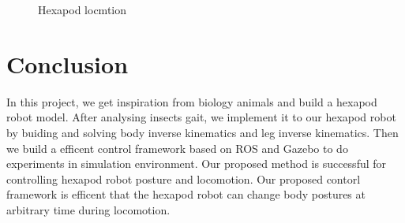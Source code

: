 \documentclass[conference]{IEEEtran}
\begin{document}
\begin{figure}
    \centering
    \caption{Hexapod locmtion}
    \label{fig1111}
\end{figure}

\section{Conclusion}

In this project, we get inspiration from biology animals and build a hexapod robot model. After analysing insects gait, we implement it to our hexapod robot by buiding and solving body inverse kinematics and leg inverse kinematics. Then we build a efficent control framework based on ROS and Gazebo to do experiments in simulation environment. Our proposed method is successful for controlling hexapod robot posture and locomotion. Our proposed contorl framework is efficent that the hexapod robot can change body postures at arbitrary time during locomotion.
\end{document}
